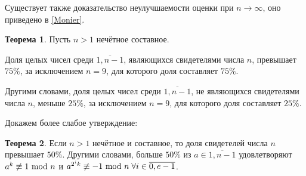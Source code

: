 \documentclass[12pt]{article}
\theoremstyle{definition}
\newtheorem{Th}{Теорема}
\numberwithin{Def}{section}
\numberwithin{Th}{section}
\numberwithin{St}{section}
\numberwithin{Cor}{section}
\begin{document}
Существует также доказательство неулучшаемости оценки при $n\to\infty$,
оно приведено в \ref{Monier}.

\begin{Th}
 	Пусть $n>1$ нечётное составное.
 
 	Доля целых чисел среди $\overline{1,n-1}$, являющихся свидетелями числа $n$,
 	превышает $75\%$, за исключением $n=9$, для которого доля составляет $75\%$.
 	
 	Другими словами, доля целых чисел среди $\overline{1,n-1}$, не являющихся
 	свидетелями числа $n$, меньше $25\%$, за исключением $n=9$, для которого доля 
 	составляет $25\%$.
\end{Th}

Докажем более слабое утверждение:

\begin{Th}
	Если $n>1$ нечётное и составное, то доля свидетелей числа $n$ превышает
	$50\%$. Другими словами, больше $50\%$ из $a\in\overline{1,n-1}$
	удовлетворяют $a^k\not\equiv 1\ \mathrm{mod}\ n$ и
	$a^{2^ik}\not\equiv-1\ \mathrm{mod}\ n\;\forall i\in\overline{0,e-1}$.
\end{Th}
\end{document}
